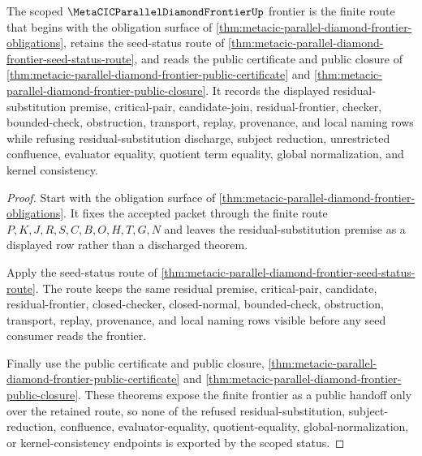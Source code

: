 \begin{theorem}
\label{thm:metacic-parallel-diamond-frontier-scoped-frontier-status}
The scoped $\MetaCICParallelDiamondFrontierUp$ frontier is the finite route that begins with the obligation surface of \autoref{thm:metacic-parallel-diamond-frontier-obligations}, retains the seed-status route of \autoref{thm:metacic-parallel-diamond-frontier-seed-status-route}, and reads the public certificate and public closure of \autoref{thm:metacic-parallel-diamond-frontier-public-certificate} and \autoref{thm:metacic-parallel-diamond-frontier-public-closure}. It records the displayed residual-substitution premise, critical-pair, candidate-join, residual-frontier, checker, bounded-check, obstruction, transport, replay, provenance, and local naming rows while refusing residual-substitution discharge, subject reduction, unrestricted confluence, evaluator equality, quotient term equality, global normalization, and kernel consistency.
\end{theorem}
\begin{proof}
Start with the obligation surface of \autoref{thm:metacic-parallel-diamond-frontier-obligations}. It fixes the accepted packet through the finite route $P,K,J,R,S,C,B,O,H,T,G,N$ and leaves the residual-substitution premise as a displayed row rather than a discharged theorem.

Apply the seed-status route of \autoref{thm:metacic-parallel-diamond-frontier-seed-status-route}. The route keeps the same residual premise, critical-pair, candidate, residual-frontier, closed-checker, closed-normal, bounded-check, obstruction, transport, replay, provenance, and local naming rows visible before any seed consumer reads the frontier.

Finally use the public certificate and public closure, \autoref{thm:metacic-parallel-diamond-frontier-public-certificate} and \autoref{thm:metacic-parallel-diamond-frontier-public-closure}. These theorems expose the finite frontier as a public handoff only over the retained route, so none of the refused residual-substitution, subject-reduction, confluence, evaluator-equality, quotient-equality, global-normalization, or kernel-consistency endpoints is exported by the scoped status.
\end{proof}

